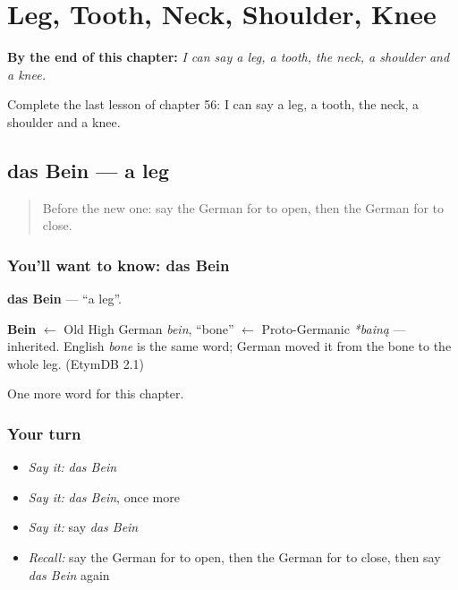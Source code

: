 
\chapter{Leg, Tooth, Neck, Shoulder, Knee}
\label{ch:ge-leg-tooth-neck-shoulder-knee}

\begin{chapteropening}
\textbf{By the end of this chapter:} \emph{I can say a leg, a tooth, the neck, a shoulder and a knee.}

Complete the last lesson of chapter 56: I can say a leg, a tooth, the neck, a shoulder and a knee.
\end{chapteropening}

\section[das Bein]{das Bein — a leg}

\label{lesson:GE-C56-bein}



\begin{quote}
Before the new one: say the German for to open, then the German for to close.
\end{quote}

\subsection*{You'll want to know: das Bein}
\textbf{das Bein} — \textquotedblleft{}a leg\textquotedblright{}.

\begin{cousinweb}
\textbf{Bein} $\leftarrow$ Old High German \emph{bein}, \textquotedblleft{}bone\textquotedblright{} $\leftarrow$ Proto-Germanic \emph{*bainą} — inherited. English \emph{bone} is the same word; German moved it from the bone to the whole leg. (EtymDB 2.1)
\end{cousinweb}

\begin{grammarlens}[title={What you've built}]
One more word for this chapter.
\end{grammarlens}

\subsection*{Your turn}
\begin{itemize}
\raggedright
  \item \emph{Say it:} \emph{das Bein}
  \item \emph{Say it:} \emph{das Bein}, once more
  \item \emph{Say it:} say \emph{das Bein}
  \item \emph{Recall:} say the German for to open, then the German for to close, then say \emph{das Bein} again
\end{itemize}

